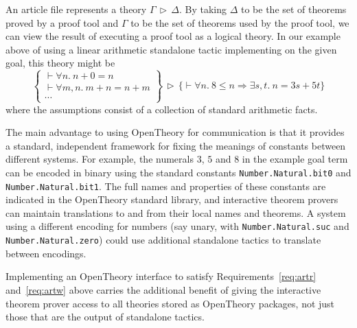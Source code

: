 \documentclass{llncs}
\newcommand{\OpenTheory}{OpenTheory\xspace}
\newcommand{\theory}[2]{{#1}\,\triangleright\,{#2}}
\begin{document}
An article file represents a theory $\theory{\Gamma}{\Delta}$.
By taking $\Delta$ to be the set of theorems proved by a proof tool and $\Gamma$ to be the set of theorems used by the proof tool, we can view the result of executing a proof tool as a logical theory.
In our example above of using a linear arithmetic standalone tactic implementing on the given goal, this theory might be
\[
\theory{\left\{\begin{array}{l}
\vdash\forall n.\ n + 0 = n \\
\vdash\forall m,n.\ m + n = n + m \\
\cdots
\end{array}\right\}}
{\bigl\{\vdash\forall n.\ 8\le n\Rightarrow\exists s,t.\ n = 3s + 5t\bigr\}}
\]
where the assumptions consist of a collection of standard arithmetic facts.


The main advantage to using \OpenTheory for communication is that it provides a standard, independent framework for fixing the meanings of constants between different systems.
For example, the numerals $3$, $5$ and $8$ in the example goal term can be encoded in binary using the standard constants \texttt{Number.Natural.bit0} and \texttt{Number.Natural.bit1}.
The full names and properties of these constants are indicated in the \OpenTheory standard library, and interactive theorem provers can maintain translations to and from their local names and theorems.
A system using a different encoding for numbers (say unary, with \texttt{Number.Natural.suc} and \texttt{Number.Natural.zero}) could use additional standalone tactics to translate between encodings.

Implementing an \OpenTheory interface to satisfy Requirements~\ref{req:artr} and~\ref{req:artw} above carries the additional benefit of giving the interactive theorem prover access to all theories stored as \OpenTheory packages, not just those that are the output of standalone tactics.
\end{document}
